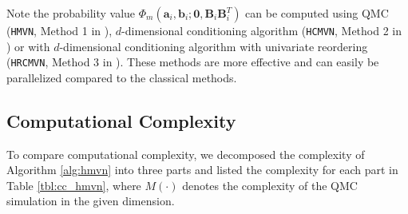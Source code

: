 Note the probability value $\Phi_m(\mathbf{a}_i, \mathbf{b}_i; \mathbf{0}, \mathbf{B}_i\mathbf{B}_i^T)$ can be computed using QMC (\texttt{HMVN}, Method 1 in \citet{cao2019hierarchical}),  $d$-dimensional conditioning algorithm (\texttt{HCMVN}, Method 2 in \citet{cao2019hierarchical}) or with $d$-dimensional conditioning algorithm with univariate reordering (\texttt{HRCMVN}, Method 3 in \citet{cao2019hierarchical}). These methods are more effective and can easily be parallelized compared to the classical methods.

\subsection{Computational Complexity}

To compare computational complexity, we decomposed the complexity of Algorithm \ref{alg:hmvn} into three parts and listed the complexity for each part in Table \ref{tbl:cc_hmvn}, where $M(\cdot)$ denotes the complexity of the QMC simulation in the given dimension. 


